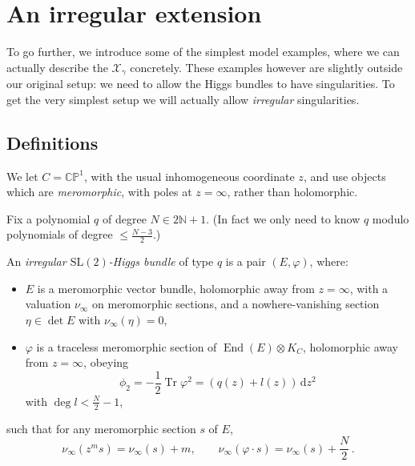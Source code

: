 \documentclass[12pt,letterpaper,reqno]{article}
\numberwithin{equation}{section}
\newcommand{\cX}{\ensuremath{\mathcal X}}
\newcommand{\bbC}{\ensuremath{\mathbb C}}
\newcommand{\bbN}{\ensuremath{\mathbb N}}
\newcommand{\bbP}{\ensuremath{\mathbb P}}
\newcommand{\de}{\mathrm{d}}
\newcommand{\ti}[1]{\textit{#1}}
\DeclareMathOperator{\Tr}{Tr}
\DeclareMathOperator{\End}{End}
\newcommand{\SL}{\mathrm{SL}}
\begin{document}
\section{An irregular extension} \label{sec:irregular-extension}

To go further, we introduce some of the simplest model examples,
where we can actually describe the $\cX_\gamma$ concretely. These examples
however are slightly outside our original setup: we need to allow
the Higgs bundles to have singularities. To get the very simplest
setup we will actually allow \ti{irregular} singularities.


\subsection{Definitions}

We let $C = \bbC\bbP^1$, with the usual inhomogeneous coordinate $z$, 
and use objects which are \ti{meromorphic},
with poles at $z = \infty$, rather than holomorphic.

Fix a polynomial $q$ of degree $N \in 2 \bbN + 1$.
(In fact we only need to know $q$ modulo polynomials of degree
$\le \frac{N-3}{2}$.)

\begin{defn}
An \ti{irregular $\SL(2)$-Higgs bundle} of type $q$ is
a pair $(E,\varphi)$, where:
\begin{itemize} 
  \item $E$ is a 
meromorphic vector bundle, holomorphic away from 
$z = \infty$, 
with a valuation $\nu_\infty$ on meromorphic sections,
and a nowhere-vanishing section $\eta \in \det E$ with $\nu_\infty(\eta) = 0$,
 \item $\varphi$ is a traceless meromorphic section of $\End(E) \otimes K_C$,
 holomorphic away from $z = \infty$, obeying 
\begin{equation} \label{eq:phi2-polynomial}
  \phi_2 = -\frac12 \Tr \varphi^2 = (q(z) + l(z)) \, \de z^2
\end{equation}
with $\deg l < \frac{N}{2} - 1$,
\end{itemize}
such that for any meromorphic section $s$ of $E$, 
\begin{equation}
\nu_\infty(z^{m} s) = \nu_\infty(s) + m, \qquad \nu_\infty(\varphi \cdot s) = \nu_\infty(s) + \frac{N}{2} \, .  
\end{equation}
\end{defn}
\end{document}
